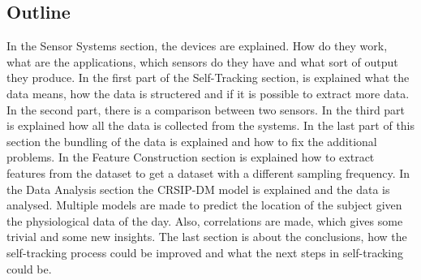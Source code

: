 	\subsection{Outline}
		In the Sensor Systems section, the devices are explained. How do they work, what are the applications, which sensors do they have and what sort of output they produce. In the first part of the Self-Tracking section, is explained what the data means, how the data is structered and if it is possible to extract more data. In the second part, there is a comparison between two sensors. In the third part is explained how all the data is collected from the systems. In the last part of this section the bundling of the data is explained and how to fix the additional problems. In the Feature Construction section is explained how to extract features from the dataset to get a dataset with a different sampling frequency. In the Data Analysis section the CRSIP-DM model is explained and the data is analysed. Multiple models are made to predict the location of the subject given the physiological data of the day. Also, correlations are made, which gives some trivial and some new insights. The last section is about the conclusions, how the self-tracking process could be improved and what the next steps in self-tracking could be.
		
	
	\iffalse
		Klad		


		It's important to explain which systems are being used, what the data means and how the data looks like. Next section there is a comparison between the two physiological devices, what was really useful to learn the devices. The data collection is the most important part of the thesis, because it's explaining how everything was set up and done to get the provided dataset. - Modeling - Conclusions 

		In the Sensor System section the hardware is explained, what the sensors does, what the applications are and how it works. 
		In the experiments section describes useful derivative data, a comparison between the two physiological devices and the experiment to combine all three devices to a good dataset.
		Modeling: I made a dataset of 15 days with all kind of features. Set the deep sleep as target attribute and use WeKa to make a model, with a discussion why deep sleep as target, how the algorithm works and hopefully some insights of the model. 
	\fi
